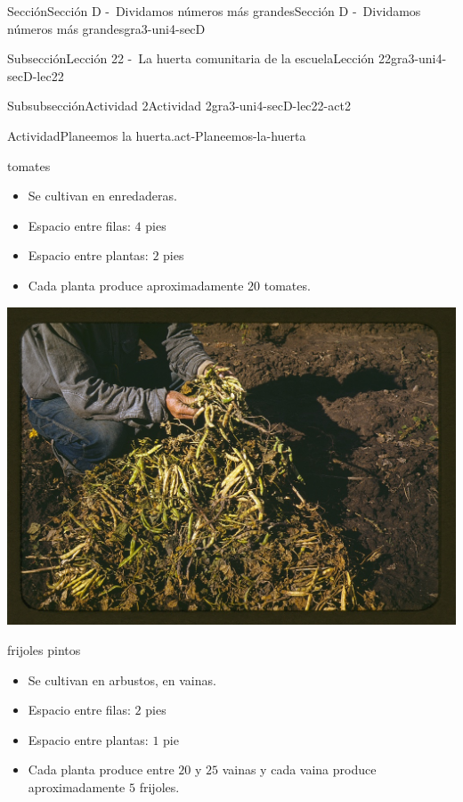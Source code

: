 \documentclass[twoside,10pt,]{article}
\begin{document}
\begin{sectionptx}{Sección}{Sección D -~Dividamos números más grandes}{}{Sección D -~Dividamos números más grandes}{}{}{gra3-uni4-secD}
\begin{subsectionptx}{Subsección}{Lección 22 -~La huerta comunitaria de la escuela}{}{Lección 22}{}{}{gra3-uni4-secD-lec22}
\begin{subsubsectionptx}{Subsubsección}{Actividad 2}{}{Actividad 2}{}{}{gra3-uni4-secD-lec22-act2}
\begin{activity}{Actividad}{Planeemos la huerta.}{act-Planeemos-la-huerta}
\begin{sidebyside}{2}{0.025}{0.025}{0.05}
\begin{sbspanel}{0.45}
%
\par
tomates%
%
\begin{itemize}[label=\textbullet]
\item{}Se cultivan en enredaderas.%
\item{}Espacio entre filas: \(4\) pies%
\item{}Espacio entre plantas: \(2\) pies%
\item{}Cada planta produce aproximadamente \(20\) tomates.%
\end{itemize}
\end{sbspanel}%
\end{sidebyside}%
\begin{sidebyside}{2}{0.025}{0.025}{0.05}%
\begin{sbspanel}{0.45}%
\includegraphics[width=\linewidth]{external/jpg-source/3-4-D-22 Act2-frijoles-pintos.jpg}
%
\par
frijoles pintos%
%
\begin{itemize}[label=\textbullet]
\item{}Se cultivan en arbustos, en vainas.%
\item{}Espacio entre filas: \(2\) pies%
\item{}Espacio entre plantas: \(1\) pie%
\item{}Cada planta produce entre \(20\) y \(25\) vainas y cada vaina produce aproximadamente \(5\) frijoles.%
\end{itemize}
\end{sbspanel}%
\begin{sbspanel}{0.45}%

\end{sbspanel}
\end{sidebyside}
\end{activity}
\end{subsubsectionptx}
\end{subsectionptx}
\end{sectionptx}
\end{document}
